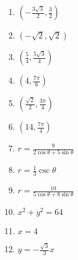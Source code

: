 \begin{enumerate}
	\item $\left(-\frac{3\sqrt{3}}{2}, \frac{3}{2}\right)$
    \item $(-\sqrt{2}, \sqrt{2})$
    \item $\left(\frac{5}{4}, \frac{5\sqrt{3}}{4}\right)$
    
    \item $\left(4, \frac{7\pi}{6}\right)$
    \item $\left(\frac{\sqrt{2}}{2}, \frac{3\pi}{4}\right)$
    \item $\left(14, \frac{7\pi}{4}\right)$
    
    \item $r = \frac{9}{2\cos\theta+5\sin\theta}$
    \item $r = \frac{1}{3}\csc\theta$
    \item $r = \frac{10}{5\cos\theta+8\sin\theta}$
    \item $x^2+y^2=64$
    \item $x = 4$
    \item $y = -\frac{\sqrt{3}}{3}x$
\end{enumerate}